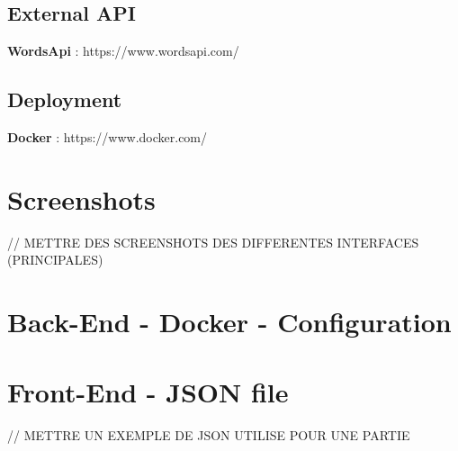 \documentclass{tnreport}
\begin{document}
\section{External API}
\textbf{WordsApi} : https://www.wordsapi.com/\\

\section{Deployment}
\textbf{Docker} : https://www.docker.com/\\


\cleardoublepage

\chapter{Screenshots}

// METTRE DES SCREENSHOTS DES DIFFERENTES INTERFACES (PRINCIPALES) \\

\cleardoublepage

\chapter{Back-End - Docker - Configuration}
\label{annexe:docker_compose}
\vspace{0.5cm}
\begin{center}
	\vspace*{-0.8in}
	
\end{center}

\cleardoublepage

\chapter{Front-End - JSON file}

// METTRE UN EXEMPLE DE JSON UTILISE POUR UNE PARTIE \\
\end{document}
